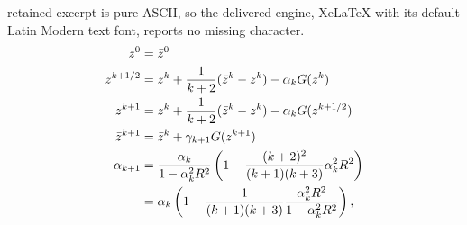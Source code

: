 \documentclass[10pt,a4paper]{amsart}
\begin{document}
retained excerpt is pure ASCII, so the delivered engine, XeLaTeX with its default Latin Modern text font, reports no missing character.
\begin{align}
    \notag z^{0}       &= \bar{z}^{0}\\
    \label{eagv update1} z^{k+1/2}   &= z^{k} + \frac{1}{k+2}(\bar{z}^{k} - z^{k}) - \alpha_{k}G(z^{k})\\
    \label{eagv update2} z^{k+1}     &= z^{k} + \frac{1}{k+2}(\bar{z}^{k} - z^{k}) - \alpha_{k}G(z^{k + 1/2})\\
    \label{eagv update3} \bar{z}^{k+1}&= \bar{z}^{k} + \gamma_{k+1}G(z^{k+1})\\
    \notag \alpha_{k+1}&= \frac{\alpha_{k}}{1 - \alpha_{k}^{2}R^{2}}\left(1 - \frac{(k+2)^{2}}{(k+1)(k+3)}\alpha_{k}^{2}R^{2}\right)\\
    &= \alpha_{k}\left(1 - \frac{1}{(k+1)(k+3)}\frac{\alpha_{k}^{2}R^{2}}{1 - \alpha_{k}^{2}R^{2}}\right), \label{normal_alpha}
\end{align}
\end{document}
